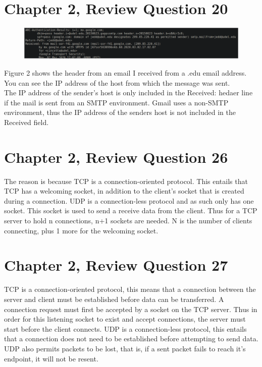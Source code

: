 \documentclass{article}
\begin{document}
\section{Chapter 2, Review Question 20}
\begin{figure}[h!]
\centering
\includegraphics[scale=0.65]{RQ20a.png}
\caption{}
\end{figure}
Figure 2 shows the header from an email I received from a .edu email address.  You can see the IP address of the host from which the message was sent.\\

The IP address of the sender's host is only included in the Received: hedaer line if the mail is sent from an SMTP environment.  Gmail uses a non-SMTP environment, thus the IP address of the senders host is not included in the Received field.\\

\section{Chapter 2, Review Question 26}
The reason is because TCP is a connection-oriented protocol.  This entails that TCP has a welcoming socket, in addition to the client's socket that is created during a connection.  UDP is a connection-less protocol and as such only has one socket.  This socket is used to send a receive data from the client.  Thus for a TCP server to hold n connections, n+1 sockets are needed.  N is the number of clients connecting, plus 1 more for the welcoming socket.\\

\section{Chapter 2, Review Question 27}
TCP is a connection-oriented protocol, this means that a connection between the server and client must be established before data can be transferred.  A connection request must first be accepted by a socket on the TCP server.  Thus in order for this listening socket to exist and accept connections, the server must start before the client connects.  UDP is a connection-less protocol, this entails that a connection does not need to be established before attempting to send data.  UDP also permits packets to be lost, that is, if a sent packet fails to reach it's endpoint, it will not be resent.\\
\end{document}
